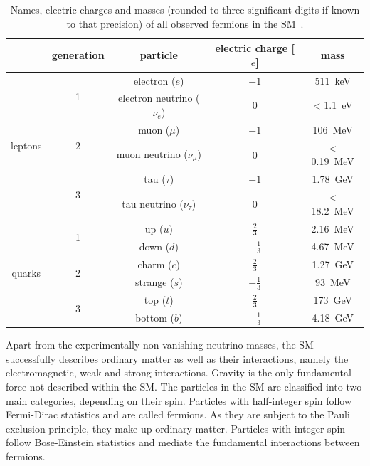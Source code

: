 \begin{table}
	\centering
	\setlength\heavyrulewidth{0.2ex}
	\small
	\caption{Names, electric charges and masses (rounded to three significant digits if known to that precision) of all observed fermions in the SM~\cite{pdg2020}.}
	\begin{tabular} {c c c c c}
		
		\toprule
				& generation & particle & electric charge [$e$] & mass \\ 
		\midrule 
				\multirow{6}{*}{leptons}& \multirow{2}{*}{1} & electron ($e$)& $-1$ & \SI{511}{\keV}\\
				& & electron neutrino ($\nu_e$) & 0 & < \SI{1.1}{\eV} \\
				& \multirow{2}{*}{2} & muon ($\mu$)& $-1$ & \SI{106}{\MeV}\\
				& & muon neutrino ($\nu_\mu$) & 0 & < \SI{0.19}{\MeV} \\
				& \multirow{2}{*}{3} & tau ($\tau$)& $-1$ & \SI{1.78}{\GeV}\\
				& & tau neutrino ($\nu_\tau$) & 0 & < \SI{18.2}{\MeV} \\
		\midrule 
				\multirow{6}{*}{quarks}& \multirow{2}{*}{1} & up ($u$)& $\frac{2}{3}$ & \SI{2.16}{\MeV}\\
				& & down ($d$) & $-\frac{1}{3}$ & \SI{4.67}{\MeV} \\
				& \multirow{2}{*}{2} & charm ($c$)& $\frac{2}{3}$ & \SI{1.27}{\GeV}\\
				& & strange ($s$) & $-\frac{1}{3}$ &\SI{93}{\MeV} \\
				& \multirow{2}{*}{3} & top ($t$)& $\frac{2}{3}$ & \SI{173}{\GeV}\\
				& & bottom ($b$) & $-\frac{1}{3}$ & \SI{4.18}{\GeV} \\
		\bottomrule
	\end{tabular}\vspace{3mm}
	\label{tab:particles_fermions}   
\end{table}

Apart from the experimentally non-vanishing neutrino masses, the SM successfully describes  ordinary matter as well as their interactions, namely the electromagnetic, weak and strong interactions. Gravity is the only fundamental force not described within the SM. The particles in the SM are classified into two main categories, depending on their spin. Particles with half-integer spin follow Fermi-Dirac statistics and are called fermions. As they are subject to the Pauli exclusion principle, they make up ordinary matter. Particles with integer spin follow Bose-Einstein statistics and mediate the fundamental interactions between fermions. 


